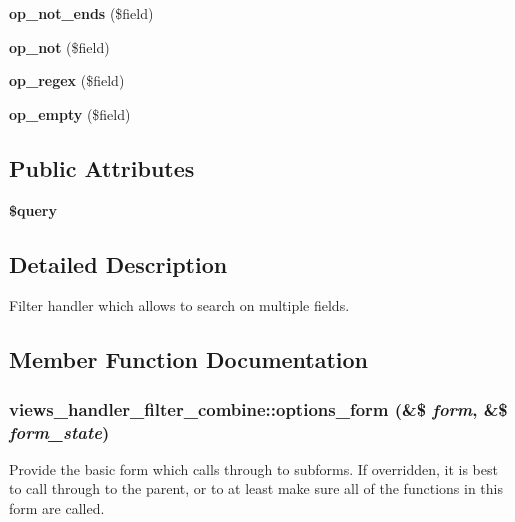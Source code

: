 \begin{DoxyCompactItemize}
\item 
\hypertarget{classviews__handler__filter__combine_a44d3eb2ad3a15e49c3674f15d59e9213}{
{\bfseries op\_\-not\_\-ends} (\$field)}
\label{classviews__handler__filter__combine_a44d3eb2ad3a15e49c3674f15d59e9213}

\item 
\hypertarget{classviews__handler__filter__combine_a30dc1e63747be583e25af0cc43999f89}{
{\bfseries op\_\-not} (\$field)}
\label{classviews__handler__filter__combine_a30dc1e63747be583e25af0cc43999f89}

\item 
\hypertarget{classviews__handler__filter__combine_a752c7733979b7e59d914931198d32aa9}{
{\bfseries op\_\-regex} (\$field)}
\label{classviews__handler__filter__combine_a752c7733979b7e59d914931198d32aa9}

\item 
\hypertarget{classviews__handler__filter__combine_a7b4a76445da999c771038be16e8b40f1}{
{\bfseries op\_\-empty} (\$field)}
\label{classviews__handler__filter__combine_a7b4a76445da999c771038be16e8b40f1}

\end{DoxyCompactItemize}
\subsection*{Public Attributes}
\begin{DoxyCompactItemize}
\item 
\hypertarget{classviews__handler__filter__combine_aebadff39cfbddb60efd77ace007b6419}{
{\bfseries \$query}}
\label{classviews__handler__filter__combine_aebadff39cfbddb60efd77ace007b6419}

\end{DoxyCompactItemize}


\subsection{Detailed Description}
Filter handler which allows to search on multiple fields. 

\subsection{Member Function Documentation}
\hypertarget{classviews__handler__filter__combine_ab9cd16cf6ee4450ea0b20ab20ebb920c}{
\subsubsection[{options\_\-form}]{\setlength{\rightskip}{0pt plus 5cm}views\_\-handler\_\-filter\_\-combine::options\_\-form (\&\$ {\em form}, \/  \&\$ {\em form\_\-state})}}
\label{classviews__handler__filter__combine_ab9cd16cf6ee4450ea0b20ab20ebb920c}
Provide the basic form which calls through to subforms. If overridden, it is best to call through to the parent, or to at least make sure all of the functions in this form are called. 

